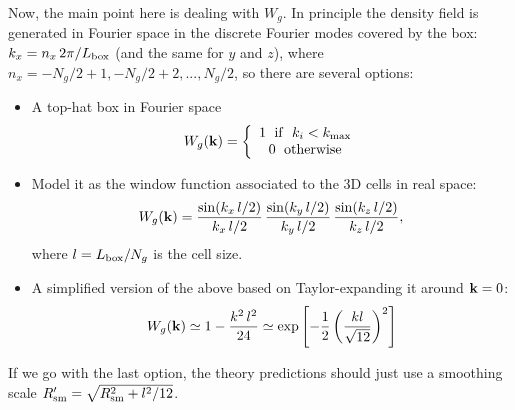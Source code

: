 \documentclass[a4paper,10pt]{article}
\begin{document}
Now, the main point here is dealing with $W_g$. In principle the density field is generated in Fourier space in the discrete Fourier modes covered by the box: $k_x=n_x\,2\pi/L_{\rm box}$ (and the same for $y$ and $z$), where $n_x=-N_g/2+1,-N_g/2+2,...,N_g/2$, so there are several options:
\begin{itemize}
 \item A top-hat box in Fourier space
   \begin{equation}
     W_g({\bf k})=\left\{
     \begin{array}{c}
       1\hspace{6pt}{\rm if}\hspace{6pt}k_i<k_{\rm max}\\
       0\hspace{6pt}{\rm otherwise}
     \end{array}\right.
   \end{equation}
 \item Model it as the window function associated to the 3D cells in real space:
   \begin{equation}
     W_g({\bf k})=\frac{\sin(k_x\,l/2)}{k_x\,l/2}\,\frac{\sin(k_y\,l/2)}{k_y\,l/2}\,\frac{\sin(k_z\,l/2)}{k_z\,l/2},
   \end{equation}
   where $l=L_{\rm box}/N_g$ is the cell size.
 \item A simplified version of the above based on Taylor-expanding it around ${\bf k}=0$:
   \begin{align}
     W_g({\bf k})\simeq1-\frac{k^2\,l^2}{24}\simeq\exp\left[-\frac{1}{2}\left(\frac{kl}{\sqrt{12}}\right)^2\right]
   \end{align}
\end{itemize}
If we go with the last option, the theory predictions should just use a smoothing scale $R'_{\rm sm}=\sqrt{R_{\rm sm}^2+l^2/12}$.



  
\end{document}
